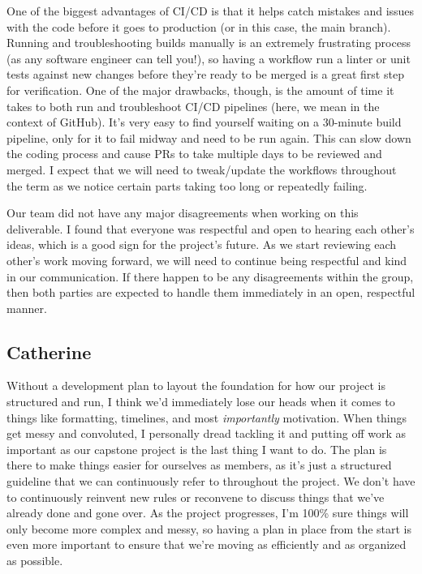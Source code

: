 \documentclass{article}
\begin{document}
One of the biggest advantages of CI/CD is that it helps catch mistakes and issues with the code before it goes to production (or in this case, the main branch). 
Running and troubleshooting builds manually is an extremely frustrating process (as any software engineer can tell you!), so having a workflow 
run a linter or unit tests against new changes before they're ready to be merged is a great first step for verification. One of the 
major drawbacks, though, is the amount of time it takes to both run and troubleshoot CI/CD pipelines (here, we mean in the context of GitHub). 
It's very easy to find yourself waiting on a 30-minute build pipeline, only for it to fail midway and need to be run again. 
This can slow down the coding process and cause PRs to take multiple days to be reviewed and merged. I expect that we will need to tweak/update the workflows throughout
the term as we notice certain parts taking too long or repeatedly failing. 

Our team did not have any major disagreements when working on this deliverable. I found that everyone was respectful 
and open to hearing each other’s ideas, which is a good sign for the project’s future. As we start reviewing each 
other’s work moving forward, we will need to continue being respectful and kind in our communication. If there happen to be 
any disagreements within the group, then both parties are expected to handle them immediately in an open, respectful manner. 


\subsection*{Catherine}

Without a development plan to layout the foundation for how our project
is structured and run, I think we'd immediately lose our heads when it comes
to things like formatting, timelines, and most \textit{importantly} motivation. 
When things get messy and convoluted, I personally dread tackling it and putting
off work as important as our capstone project is the last thing I want to do.
The plan is there to make things easier for ourselves as members, as it's 
just a structured guideline that we can continuously refer to throughout the 
project. We don't have to continuously reinvent new rules or reconvene to 
discuss things that we've already done and gone over. As the project progresses,
I'm 100\% sure things will only become more complex and messy, so having a plan in 
place from the start is even more important to ensure that we're moving as efficiently
and as organized as possible.
\end{document}
